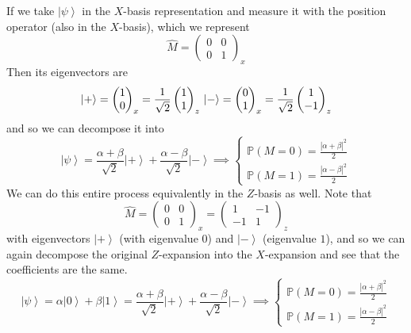 \documentclass{article}
\newcommand{\ket}[1]{\ensuremath{\left|#1\right\rangle}}
\begin{document}
    \begin{example} 
      If we take $\ket{\psi}$ in the $X$-basis representation and measure it with the position operator (also in the $X$-basis), which we represent 
      \begin{equation} 
        \hat{M} = \begin{pmatrix} 0 & 0 \\ 0 & 1 \end{pmatrix}_x
      \end{equation} 
      Then its eigenvectors are 
      \begin{equation} 
        \ket{+} = \begin{pmatrix} 1 \\ 0 \end{pmatrix}_x = \frac{1}{\sqrt{2}} \begin{pmatrix} 1 \\ 1 \end{pmatrix}_z \\ 
        \ket{-} = \begin{pmatrix} 0 \\ 1 \end{pmatrix}_x = \frac{1}{\sqrt{2}} \begin{pmatrix} 1 \\ -1 \end{pmatrix}_z 
      \end{equation}
      and so we can decompose it into 
      \begin{equation} 
        \ket{\psi} = \frac{\alpha + \beta}{\sqrt{2}} \ket{+} + \frac{\alpha - \beta}{\sqrt{2}} \ket{-} \implies \begin{cases} \mathbb{P}(M = 0) = \frac{|\alpha + \beta|^2}{2} \\ \mathbb{P}(M = 1) = \frac{|\alpha - \beta|^2}{2} \end{cases}
      \end{equation}
      We can do this entire process equivalently in the $Z$-basis as well. Note that 
      \begin{equation} 
        \hat{M} = \begin{pmatrix} 0 & 0 \\ 0 & 1 \end{pmatrix}_x = \begin{pmatrix} 1 & -1 \\ -1 & 1 \end{pmatrix}_z
      \end{equation}
      with eigenvectors $\ket{+}$ (with eigenvalue $0$) and $\ket{-}$ (eigenvalue $1$), and so we can again decompose the original $Z$-expansion into the $X$-expansion and see that the coefficients are the same. 
      \begin{equation} 
        \ket{\psi} = \alpha \ket{0} + \beta \ket{1} = \frac{\alpha + \beta}{\sqrt{2}} \ket{+} + \frac{\alpha - \beta}{\sqrt{2}} \ket{-} \implies \begin{cases} \mathbb{P}(M = 0) = \frac{|\alpha + \beta|^2}{2} \\ \mathbb{P}(M = 1) = \frac{|\alpha - \beta|^2}{2} \end{cases}
      \end{equation} 
    \end{example}
\end{document}
